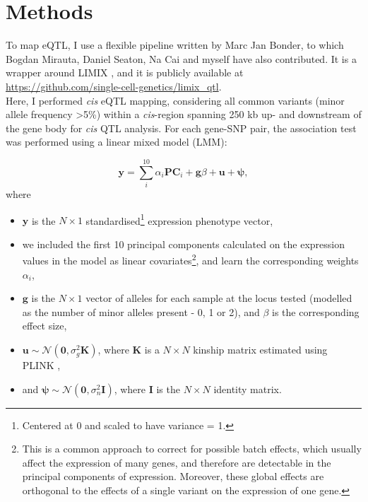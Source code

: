 
\newpage

\section{Methods}

To map eQTL, I use a flexible pipeline written by Marc Jan Bonder, to which Bogdan Mirauta, Daniel Seaton, Na Cai and myself have also contributed. 
It is a wrapper around LIMIX \cite{lippert2014limix, casale2015efficient}, and it is publicly available at \url{https://github.com/single-cell-genetics/limix_qtl}. \\

Here, I performed \textit{cis} eQTL mapping, considering all common variants (minor allele frequency >5\%) within a \textit{cis}-region spanning 250 kb up- and downstream of the gene body for \textit{cis} QTL analysis. 
For each gene-SNP pair, the association test was performed using a linear mixed model (LMM):

\begin{equation}
    \mathbf{y} = \sum_i^{10}\alpha_i \mathbf{PC}_i + \mathbf{g}\beta + \mathbf{u} + \boldsymbol{\psi},  
\end{equation}
where 
\begin{itemize}
    \item $\mathbf{y}$ is the $N \times 1$ standardised\footnote{Centered at 0 and scaled to have variance = 1.} expression phenotype vector,
    \item we included the first 10 principal components calculated on the expression values in the model as linear covariates\footnote{This is a common approach to correct for possible batch effects, which usually affect the expression of many genes, and therefore are detectable in the principal components of expression. 
    Moreover, these global effects are orthogonal to the effects of a single variant on the expression of one gene.}, and learn the corresponding weights $\alpha_i$,
    \item $\mathbf{g}$ is the $N \times 1$ vector of alleles for each sample at the locus tested (modelled as the number of minor alleles present - 0, 1 or 2), and $\beta$ is the corresponding effect size,
    \item $\mathbf{u} \sim \mathcal{N}(\mathbf{0}, \sigma_g^2\mathbf{K})$, where $\mathbf{K}$ is a $N \times N$ kinship matrix estimated using PLINK \cite{purcell2007plink},
    \item and $\boldsymbol{\psi} \sim \mathcal{N}(\mathbf{0}, \sigma_n^2\mathbf{I})$, where $\mathbf{I}$ is the $N \times N$ identity matrix.\\
\end{itemize}

